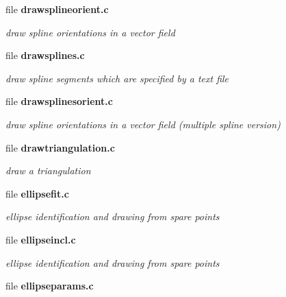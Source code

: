 \begin{DoxyCompactItemize}
\item 
file {\bf drawsplineorient.c}


\begin{DoxyCompactList}\small\item\em draw spline orientations in a vector field \item\end{DoxyCompactList}

\item 
file {\bf drawsplines.c}


\begin{DoxyCompactList}\small\item\em draw spline segments which are specified by a text file \item\end{DoxyCompactList}

\item 
file {\bf drawsplinesorient.c}


\begin{DoxyCompactList}\small\item\em draw spline orientations in a vector field (multiple spline version) \item\end{DoxyCompactList}

\item 
file {\bf drawtriangulation.c}


\begin{DoxyCompactList}\small\item\em draw a triangulation \item\end{DoxyCompactList}

\item 
file {\bf ellipsefit.c}


\begin{DoxyCompactList}\small\item\em ellipse identification and drawing from spare points \item\end{DoxyCompactList}

\item 
file {\bf ellipseincl.c}


\begin{DoxyCompactList}\small\item\em ellipse identification and drawing from spare points \item\end{DoxyCompactList}

\item 
file {\bf ellipseparams.c}



\end{DoxyCompactItemize}
